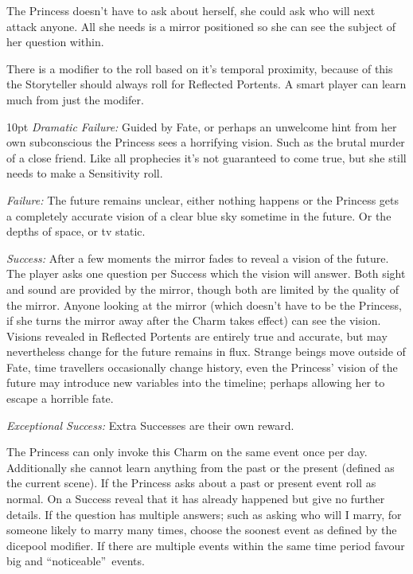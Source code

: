 The Princess doesn't have to ask about herself, she could ask who will next attack anyone. All she needs is a mirror positioned so she can see the subject of her question within. 

There is a modifier to the roll based on it's temporal proximity, because of this the Storyteller should always roll for Reflected Portents. A smart player can learn much from just the modifer.


   \begin{myindentpar}{10pt} \emph{Dramatic Failure:} Guided by Fate, or perhaps an unwelcome hint from her own subconscious the Princess sees a horrifying vision. Such as the brutal murder of a close friend. Like all prophecies it's not guaranteed to come true, but she still needs to make a Sensitivity roll.

    \emph{Failure:} The future remains unclear, either nothing happens or the Princess gets a completely accurate vision of a clear blue sky sometime in the future. Or the depths of space, or tv static.

    \emph{Success:} After a few moments the mirror fades to reveal a vision of the future. The player asks one question per Success which the vision will answer. Both sight and sound are provided by the mirror, though both are limited by the quality of the mirror. Anyone looking at the mirror (which doesn't have to be the Princess, if she turns the mirror away after the Charm takes effect) can see the vision. Visions revealed in Reflected Portents are entirely true and accurate, but may nevertheless change for the future remains in flux. Strange beings move outside of Fate, time travellers occasionally change history, even the Princess' vision of the future may introduce new variables into the timeline; perhaps allowing her to escape a horrible fate.

    \emph{Exceptional Success:} Extra Successes are their own reward.\end{myindentpar}

The Princess can only invoke this Charm on the same event once per day. Additionally she cannot learn anything from the past or the present (defined as the current scene). If the Princess asks about a past or present event roll as normal. On a Success reveal that it has already happened but give no further details. If the question has multiple answers; such as asking who will I marry, for someone likely to marry many times, choose the soonest event as defined by the dicepool modifier. If there are multiple events within the same time period favour big and \textquotedblleft noticeable\textquotedblright\, events.

